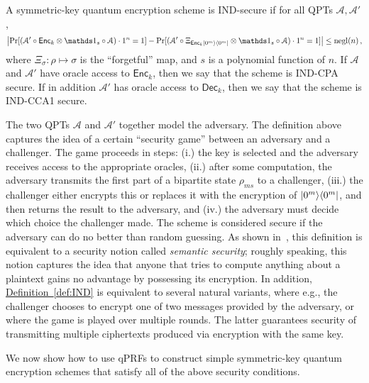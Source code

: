 \documentclass[envcountsame]{llncs}
\numberwithin{equation}{section}
\newcommand{\one}{\mathds 1}
\newcommand{\opn}{\operatorname}
\newcommand{\expref}[2]{\texorpdfstring{\hyperref[#2]{#1~\ref{#2}}}{#1~\ref{#2}}}
\newcommand{\algo}{\mathcal}
\newcommand{\negl}{\opn{negl}}
\newcommand{\Enc}{\ensuremath{\mathsf{Enc}}\xspace}
\newcommand{\Dec}{\ensuremath{\mathsf{Dec}}\xspace}
\newcommand{\prob}{\opn{Pr}}
\begin{document}
\begin{definition}\label{def:IND}
A symmetric-key quantum encryption scheme is IND-secure if for all QPTs $\algo A, \algo A'$,
$$
\left|\prob[ (\algo A' \circ \Enc_k \otimes \one_s \circ \algo A) \cdot 1^n = 1] -
\prob[ (\algo A' \circ \Xi_{\Enc_k \ket{0^m}\bra{0^m}} \otimes \one_s \circ \algo A) \cdot 1^n = 1] \right|
\leq \negl(n)\,,
$$ 
where $\Xi_\sigma: \rho \mapsto \sigma$ is the ``forgetful'' map, and $s$ is a polynomial function of $n$. If $\algo A$ and $\algo A'$ have oracle access to $\Enc_k$, then we say that the scheme is IND-CPA secure. If in addition $\algo A'$ has oracle access to $\Dec_k$, then we say that the scheme is IND-CCA1 secure.
\end{definition}

The two QPTs $\algo A$ and $\algo A'$ together model the adversary. The definition above captures the idea of a certain ``security game'' between an adversary and a challenger. The game proceeds in steps: (i.) the key is selected and the adversary receives access to the appropriate oracles, (ii.) after some computation, the adversary transmits the first part of a bipartite state $\rho_{ms}$ to a challenger, (iii.) the challenger either encrypts this or replaces it with the encryption of ${\left\vert{0^m}\right\rangle}{\left\langle{0^m}\right\vert}$, and then returns the result to the adversary, and (iv.) the adversary must decide which choice the challenger made. The scheme is considered secure if the adversary can do no better than random guessing. As shown in~\cite{ABFGSS16}, this definition is equivalent to a security notion called \emph{semantic security}; roughly speaking, this notion captures the idea that anyone that tries to compute anything about a plaintext gains no advantage by possessing its encryption. In addition, \expref{Definition}{def:IND} is equivalent to several natural variants, where e.g., the challenger chooses to encrypt one of two messages provided by the adversary, or where the game is played over multiple rounds. The latter guarantees security of transmitting multiple ciphertexts produced via encryption with the same key.

We now show how to use qPRFs to construct simple symmetric-key quantum encryption schemes that satisfy all of the above security conditions.
\end{document}
